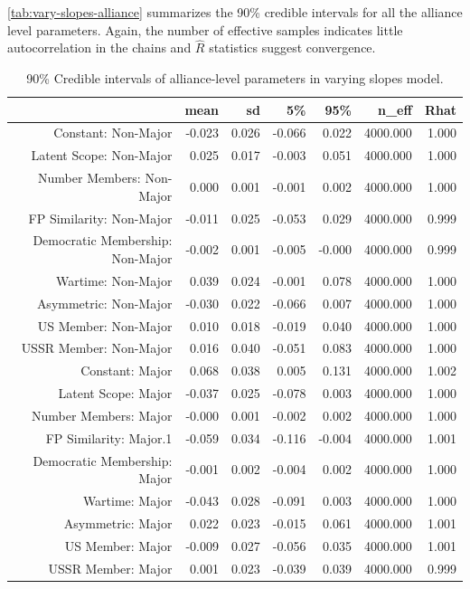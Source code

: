 \documentclass[12pt]{article}
\begin{document}
\autoref{tab:vary-slopes-alliance} summarizes the 90\% credible intervals for all the alliance level parameters. 
Again, the number of effective samples indicates little autocorrelation in the chains and $\hat{R}$ statistics suggest convergence. 


\begin{table}[ht]
\centering
\begin{tabular}{rrrrrrr}
  \hline
 & mean & sd & 5\% & 95\% & n\_eff & Rhat \\ 
  \hline
  Constant: Non-Major & -0.023 & 0.026 & -0.066 & 0.022 & 4000.000 & 1.000 \\ 
  Latent Scope: Non-Major & 0.025 & 0.017 & -0.003 & 0.051 & 4000.000 & 1.000 \\ 
  Number Members: Non-Major & 0.000 & 0.001 & -0.001 & 0.002 & 4000.000 & 1.000 \\ 
  FP Similarity: Non-Major & -0.011 & 0.025 & -0.053 & 0.029 & 4000.000 & 0.999 \\ 
  Democratic Membership: Non-Major & -0.002 & 0.001 & -0.005 & -0.000 & 4000.000 & 0.999 \\ 
  Wartime: Non-Major & 0.039 & 0.024 & -0.001 & 0.078 & 4000.000 & 1.000 \\ 
  Asymmetric: Non-Major & -0.030 & 0.022 & -0.066 & 0.007 & 4000.000 & 1.000 \\ 
  US Member: Non-Major & 0.010 & 0.018 & -0.019 & 0.040 & 4000.000 & 1.000 \\ 
  USSR Member: Non-Major & 0.016 & 0.040 & -0.051 & 0.083 & 4000.000 & 1.000 \\ 
  Constant: Major & 0.068 & 0.038 & 0.005 & 0.131 & 4000.000 & 1.002 \\ 
  Latent Scope: Major & -0.037 & 0.025 & -0.078 & 0.003 & 4000.000 & 1.000 \\ 
  Number Members: Major & -0.000 & 0.001 & -0.002 & 0.002 & 4000.000 & 1.000 \\ 
  FP Similarity: Major.1 & -0.059 & 0.034 & -0.116 & -0.004 & 4000.000 & 1.001 \\ 
  Democratic Membership: Major & -0.001 & 0.002 & -0.004 & 0.002 & 4000.000 & 1.000 \\ 
  Wartime: Major & -0.043 & 0.028 & -0.091 & 0.003 & 4000.000 & 1.000 \\ 
  Asymmetric: Major & 0.022 & 0.023 & -0.015 & 0.061 & 4000.000 & 1.001 \\ 
  US Member: Major & -0.009 & 0.027 & -0.056 & 0.035 & 4000.000 & 1.001 \\ 
  USSR Member: Major & 0.001 & 0.023 & -0.039 & 0.039 & 4000.000 & 0.999 \\ 
   \hline
\end{tabular}
\caption{90\% Credible intervals of alliance-level parameters in varying slopes model.}
\label{tab:vary-slopes-alliance}
\end{table}

  
 
\end{document}
